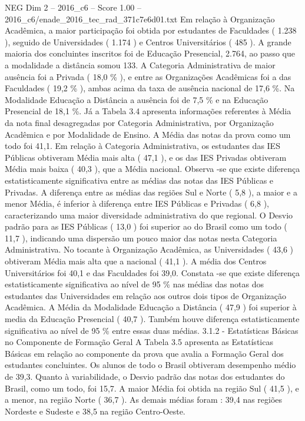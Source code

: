 \begin{textsample}{NEG Dim 2 – 2016\_c6 – Score 1.00 – 2016\_c6/enade\_2016\_tec\_rad\_371c7e6d01.txt}
Em relação à Organização Acadêmica, a maior participação foi obtida por estudantes de Faculdades ( 1.238 ), seguido de Universidades ( 1.174 ) e Centros Universitários ( 485 ).
A grande maioria dos concluintes inscritos foi de Educação Presencial, 2.764, ao passo que a modalidade a distância somou 133.
A Categoria Administrativa de maior ausência foi a Privada ( 18,0 \% ), e entre as Organizações Acadêmicas foi a das Faculdades ( 19,2 \% ), ambas acima da taxa de ausência nacional de 17,6 \%.
Na Modalidade Educação a Distância a ausência foi de 7,5 \% e na Educação Presencial de 18,1 \%.
Já a Tabela 3.4 apresenta informações referentes à Média da nota final desagregadas por Categoria Administrativa, por Organização Acadêmica e por Modalidade de Ensino.
A Média das notas da prova como um todo foi 41,1.
Em relação à Categoria Administrativa, os estudantes das IES Públicas obtiveram Média mais alta ( 47,1 ), e os das IES Privadas obtiveram Média mais baixa ( 40,3 ), que a Média nacional.
Observa -se que existe diferença estatisticamente significativa entre as médias das notas das IES Públicas e Privadas.
A diferença entre as médias das regiões Sul e Norte ( 5,8 ), a maior e a menor Média, é inferior à diferença entre IES Públicas e Privadas ( 6,8 ), caracterizando uma maior diversidade administrativa do que regional.
O Desvio padrão para as IES Públicas ( 13,0 ) foi superior ao do Brasil como um todo ( 11,7 ), indicando uma dispersão um pouco maior das notas nesta Categoria Administrativa.
No tocante à Organização Acadêmica, as Universidades ( 43,6 ) obtiveram Média mais alta que a nacional ( 41,1 ).
A média dos Centros Universitários foi 40,1 e das Faculdades foi 39,0.
Constata -se que existe diferença estatisticamente significativa ao nível de 95 \% nas médias das notas dos estudantes das Universidades em relação aos outros dois tipos de Organização Acadêmica.
A Média da Modalidade Educação a Distância ( 47,9 ) foi superior à media da Educação Presencial ( 40,7 ).
Também houve diferença estatisticamente significativa ao nível de 95 \% entre essas duas médias. 3.1.2 - Estatísticas Básicas no Componente de Formação Geral A Tabela 3.5 apresenta as Estatísticas Básicas em relação ao componente da prova que avalia a Formação Geral dos estudantes concluintes.
Os alunos de todo o Brasil obtiveram desempenho médio de 39,3.
Quanto à variabilidade, o Desvio padrão das notas dos estudantes do Brasil, como um todo, foi 15,7.
A maior Média foi obtida na região Sul ( 41,5 ), e a menor, na região Norte ( 36,7 ).
As demais médias foram : 39,4 nas regiões Nordeste e Sudeste e 38,5 na região Centro-Oeste.

\end{textsample}
